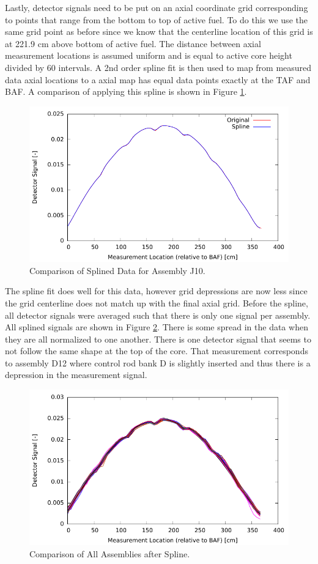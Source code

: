 Lastly, detector signals need to be put on an axial coordinate grid corresponding 
to points that range from the bottom to top of active fuel. To do this we use the same 
grid point as before since we know that the centerline location of this grid is at 
221.9 cm above bottom of active fuel. The distance between axial measurement locations 
is assumed uniform and is equal to active core height divided by 60 intervals. A 2nd 
order spline fit is then used to map from measured data axial locations to a axial map 
has equal data points exactly at the \ac{TAF} and \ac{BAF}.  A comparison of 
applying this spline is shown in Figure \ref{fig:splineassy}.
\begin{figure}[htbp]
    \centering
    \includegraphics{expdata/figs/spline_assy.pdf}
    \caption{Comparison of Splined Data for Assembly J10. \label{fig:splineassy}}
\end{figure}
The spline fit does well for this data, however grid depressions are now less since the 
grid centerline does not match up with the final axial grid.  Before the spline, all 
detector signals were averaged such that there is only one signal per assembly. All splined 
signals are shown in Figure \ref{fig:splineall}. There is some spread in the data when they 
are all normalized to one another. There is one detector signal that seems to not follow the 
same shape at the top of the core. That measurement corresponds to assembly D12 where control 
rod bank D is slightly inserted and thus there is a depression in the measurement signal.
\begin{figure}[htbp]
    \centering
    \includegraphics{expdata/figs/spline_all.pdf}
    \caption{Comparison of All Assemblies after Spline. \label{fig:splineall}}
\end{figure}
